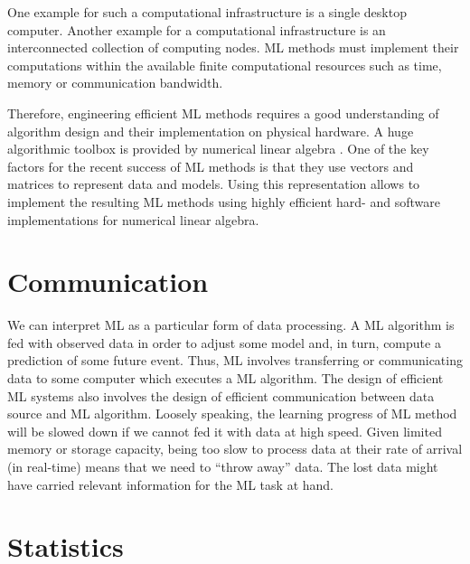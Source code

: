 \documentclass[12pt]{report}
\begin{document}
One example for such a computational infrastructure is a single 
desktop computer. Another example for a computational infrastructure 
is an interconnected collection of computing nodes. ML methods 
must implement their computations within the available finite computational 
resources such as time, memory or communication bandwidth.  

Therefore, engineering efficient ML methods requires a good understanding of algorithm 
design and their implementation on physical hardware. A huge algorithmic toolbox is provided 
by numerical linear algebra \cite{StrangLinAlg2016,Strang2007}. One of the key factors for the 
recent success of ML methods is that they use vectors and matrices to represent data and 
models. Using this representation allows to implement the resulting ML methods using highly 
efficient hard- and software implementations for numerical linear algebra. 


\section{Communication} 

We can interpret ML as a particular form of data processing. A ML 
algorithm is fed with observed data in order to adjust some model and, in turn, compute 
a prediction of some future event. Thus, ML involves transferring or communicating 
data to some computer which executes a ML algorithm. The design of efficient 
ML systems also involves the design of efficient communication between data source 
and ML algorithm. Loosely speaking, the learning progress of ML method will be 
slowed down if we cannot fed it with data at high speed. Given limited memory or storage capacity, 
being too slow to process data at their rate of arrival (in real-time) means that we need to 
``throw away'' data. The lost data might have carried relevant information for the ML task at hand. 



\section{Statistics}

\end{document}
